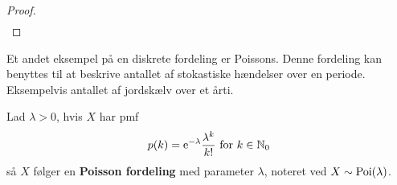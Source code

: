 \begin{proof}
\begin{align*}
    \end{align*}
\end{proof}

Et andet eksempel på en diskrete fordeling er Poissons. Denne fordeling kan benyttes til at beskrive antallet af stokastiske hændelser over en periode. Eksempelvis antallet af jordskælv over et årti.
\begin{defn}\label{def:poisson}
    Lad $\lambda>0$, hvis $X$ har pmf
    \begin{align*}
         p(k)=\mathrm{e}^{-\lambda}\frac{\lambda^k}{k!}\text{ for } k\in\mathbb{N}_0
    \end{align*}
    så $X$ følger en \textbf{Poisson fordeling} med parameter $\lambda$, noteret ved $X\sim\textnormal{Poi}(\lambda)$.
\end{defn}

